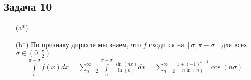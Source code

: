 \begin{comment}
	\end{gather*}
	Второй интеграл ограничен
	\begin{gather*}
		\frac{1}{2\pi} \int\limits_{\sigma \leqslant |t| \leqslant \pi} 2 (\sup\limits_{-\pi \leqslant t \leqslant \pi} |f(t)|) F_n(t) dt F_n(t) dt
		= \frac{\sup\limits_{-\pi \leqslant t \leqslant \pi} |f(t)|}{\pi} \int\limits_{\sigma \leqslant |t| \leqslant \pi} F_n(t) dt
	\end{gather*}
	Тогда существует $a \in \mathbb{N}$ такое что для всех $n \geqslant a,\ \int\limits_{\sigma \leqslant |t| \leqslant \pi} F_n(t) dt \leqslant \varepsilon$. Тогда $n \geqslant a,\ |f(x) - \sigma_n(x)| \leqslant \varepsilon + \varepsilon = 2\varepsilon$
\end{comment}
\vskip 0.4in

\subsection*{Задача 10}
\begin{enumerate}
\item[(a*)]

\begin{comment}
	Обозначим через $S_n(x)$ частичную сумму.
	\begin{gather*}
		S_n\left(\frac{1}{n}\right)
		= \sum\limits_{k = 1}^{n} \frac{\sin\left(\frac{k}{n}\right)}{\sqrt{k}}
		= \sqrt{n} \cdot \frac{1}{n} \sum\limits_{k = 1}^{n} \frac{\sin\left(\frac{k}{n}\right)}{\sqrt{\frac{k}{n}}}
	\end{gather*}
	Заметим что
	\begin{gather*}
		0 \ne \int_{0}^{1} \frac{\sin(x)}{\sqrt{x}}dx
		= \lim\limits_{n \to \infty} \frac{1}{n} \sum\limits_{k = 1}^{n} \frac{\sin\left(\frac{k}{n}\right)}{\sqrt{\frac{k}{n}}}
	\end{gather*}
	Откуда
	\begin{gather*}
		\lim\limits_{n \to \infty} S_n \left(\frac{1}{n}\right)
		= \infty
		\ne S(0)
		= 0
	\end{gather*}
\end{comment}

\item[(b*)]
	По признаку дирихле мы знаем, что $f$ сходится на $[\sigma, \pi - \sigma]$ для всех $\sigma \in (0, \frac{\pi}{2})$
	\begin{gather*}
		\int\limits_{\sigma}^{\pi - \sigma} f(x)dx
		= \sum\limits_{n = 2}^{\infty} \int\limits_{\sigma}^{\pi - \sigma} \frac{\sin(nx)}{\ln(n)} dx
		= \sum\limits_{n = 2}^{\infty} \frac{1 + (-1)^{n-1}}{n \ln(n)} \cos(n \sigma)
	\end{gather*}
\end{enumerate}
